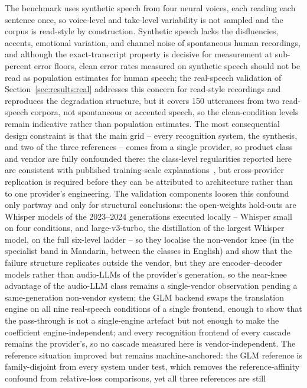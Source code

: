 The benchmark uses synthetic speech from four neural voices, each reading
each sentence once, so voice-level and take-level variability is not
sampled and the corpus is read-style by construction. Synthetic
speech lacks the disfluencies, accents, emotional variation, and channel
noise of spontaneous human recordings, and although the exact-transcript
property is decisive for measurement at sub-percent error floors, clean
error rates measured on synthetic speech should not be read as population
estimates for human speech; the real-speech validation of
Section~\ref{sec:results:real} addresses this concern for read-style
recordings and reproduces the degradation structure, but it covers 150
utterances from two read-speech corpora, not spontaneous or accented
speech, so the clean-condition levels remain indicative rather than
population estimates. The most consequential design
constraint is that the main grid -- every recognition system, the synthesis,
and two of the three references -- comes from a single provider, so product
class and vendor are fully confounded there: the class-level regularities
reported here are consistent with published
training-scale explanations~\citep{radford2023robust}, but cross-provider
replication is required before they can be attributed to architecture
rather than to one provider's engineering. The validation components
loosen this confound only partway and only for structural conclusions:
the open-weights hold-outs are Whisper models of the 2023--2024
generations executed locally -- Whisper small on four conditions, and
large-v3-turbo, the distillation of the largest Whisper model, on the
full six-level ladder -- so they localise the non-vendor knee (in the
specialist band in Mandarin, between the classes in English) and show
that the failure structure replicates outside the vendor, but they are
encoder--decoder models rather than audio-LLMs of the provider's
generation, so the near-knee advantage of the audio-LLM class remains a
single-vendor observation pending a same-generation non-vendor system; the
GLM backend swaps the
translation engine on all nine real-speech conditions of a single
frontend, enough to show that the pass-through is not a single-engine
artefact but not enough to make the coefficient engine-independent; and
every recognition frontend of every cascade remains the provider's, so no
cascade measured here is vendor-independent. The reference situation
improved but remains machine-anchored: the GLM reference is family-disjoint
from every system under test, which removes the reference-affinity confound
from relative-loss comparisons, yet all three references are still
